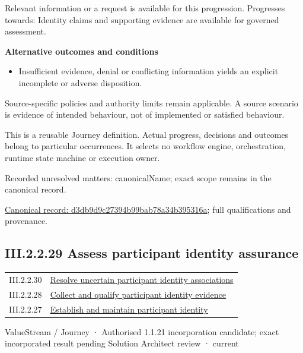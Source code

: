 Relevant information or a request is available for this progression. Progresses towards: Identity claims and supporting evidence are available for governed assessment.



\par\medskip\textbf{Alternative outcomes and conditions}\par


\begin{itemize}


\item Insufficient evidence, denial or conflicting information yields an explicit incomplete or adverse disposition.

\end{itemize}


Source-specific policies and authority limits remain applicable. A source scenario is evidence of intended behaviour, not of implemented or satisfied behaviour.



This is a reusable Journey definition. Actual progress, decisions and outcomes belong to particular occurrences. It selects no workflow engine, orchestration, runtime state machine or execution owner.


{\small Recorded unresolved matters: canonicalName; exact scope remains in the canonical record.}\par
{\footnotesize \href{../../../../continuum/strategy/value-stream/d3db9d9c27394b99bab78a34b395316a.md}{Canonical record: d3db9d9c27394b99bab78a34b395316a}; full qualifications and provenance.}\par
\subsection*{III.2.2.29 Assess participant identity assurance}
\label{navigation:III.2.2.29}

\begin{longtable}{p{.22\linewidth}p{.73\linewidth}}
III.2.2.30 & \hyperref[element:32fcf92667ae46578ab213f879c8a799]{Resolve uncertain participant identity associations} \\
III.2.2.28 & \hyperref[element:d3db9d9c27394b99bab78a34b395316a]{Collect and qualify participant identity evidence} \\
III.2.2.27 & \hyperref[element:f0ce31d5b71c4c5ab37ade566b224808]{Establish and maintain participant identity} \\
\end{longtable}
\label{element:215676da8a3040bba2fa02574a4c3443}
{\small ValueStream / Journey · Authorised 1.1.21 incorporation candidate; exact incorporated result pending Solution Architect review · current}\par

